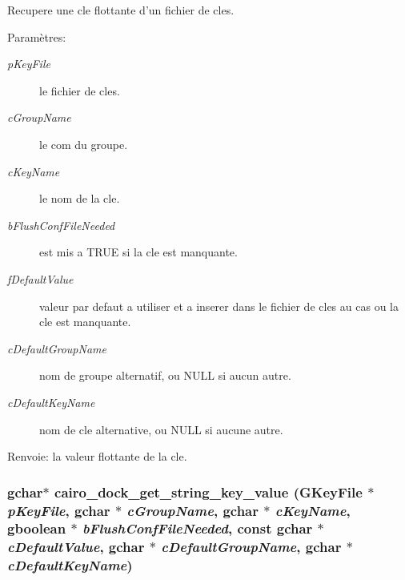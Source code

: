 Recupere une cle flottante d'un fichier de cles. \begin{Desc}
\item[Paramètres:]
\begin{description}
\item[{\em pKeyFile}]le fichier de cles. \item[{\em cGroupName}]le com du groupe. \item[{\em cKeyName}]le nom de la cle. \item[{\em bFlushConfFileNeeded}]est mis a TRUE si la cle est manquante. \item[{\em fDefaultValue}]valeur par defaut a utiliser et a inserer dans le fichier de cles au cas ou la cle est manquante. \item[{\em cDefaultGroupName}]nom de groupe alternatif, ou NULL si aucun autre. \item[{\em cDefaultKeyName}]nom de cle alternative, ou NULL si aucune autre. \end{description}
\end{Desc}
\begin{Desc}
\item[Renvoie:]la valeur flottante de la cle. \end{Desc}
\subsubsection{\setlength{\rightskip}{0pt plus 5cm}gchar$\ast$ cairo\_\-dock\_\-get\_\-string\_\-key\_\-value (GKeyFile $\ast$ {\em pKeyFile}, gchar $\ast$ {\em cGroupName}, gchar $\ast$ {\em cKeyName}, gboolean $\ast$ {\em bFlushConfFileNeeded}, const gchar $\ast$ {\em cDefaultValue}, gchar $\ast$ {\em cDefaultGroupName}, gchar $\ast$ {\em cDefaultKeyName})}\label{cairo-dock-config_8h_d2c3f7bb0639011e853368d89480417b}



